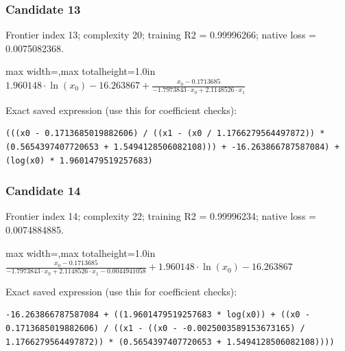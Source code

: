 \documentclass[10pt,letterpaper,landscape]{article}
\begin{document}
\subsubsection*{Candidate 13}
Frontier index 13; complexity 20; training R2 = 0.99996266; native loss = 0.0075082368.
\begin{center}\begin{adjustbox}{max width=\linewidth,max totalheight=1.0in}$\displaystyle 1.960148 \cdot \ln{\left(x_{0} \right)} - 16.263867 + \frac{x_{0} - 0.1713685}{- 1.7973843 \cdot x_{0} + 2.1148526 \cdot x_{1}}$\end{adjustbox}\end{center}
{\scriptsize Exact saved expression (use this for coefficient checks):}
\begin{lstlisting}
(((x0 - 0.1713685019882606) / ((x1 - (x0 / 1.1766279564497872)) * (0.5654397407720653 + 1.5494128506082108))) + -16.263866787587084) + (log(x0) * 1.9601479519257683)
\end{lstlisting}
\subsubsection*{Candidate 14}
Frontier index 14; complexity 22; training R2 = 0.99996234; native loss = 0.0074884885.
\begin{center}\begin{adjustbox}{max width=\linewidth,max totalheight=1.0in}$\displaystyle \frac{x_{0} - 0.1713685}{- 1.7973843 \cdot x_{0} + 2.1148526 \cdot x_{1} - 0.0044941058} + 1.960148 \cdot \ln{\left(x_{0} \right)} - 16.263867$\end{adjustbox}\end{center}
{\scriptsize Exact saved expression (use this for coefficient checks):}
\begin{lstlisting}
-16.263866787587084 + ((1.9601479519257683 * log(x0)) + ((x0 - 0.1713685019882606) / ((x1 - ((x0 - -0.0025003589153673165) / 1.1766279564497872)) * (0.5654397407720653 + 1.5494128506082108))))
\end{lstlisting}
\end{document}
